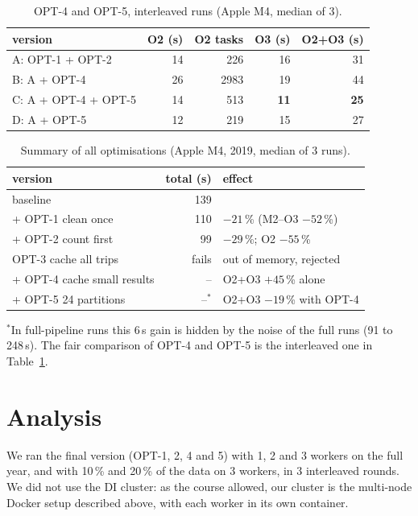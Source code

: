 \documentclass[sigconf]{acmart}
\begin{document}
\begin{table}[h]
\caption{OPT-4 and OPT-5, interleaved runs (Apple M4, median of 3).}
\label{tab:ab}
\begin{tabular}{lrrrr}
\toprule
version & O2 (s) & O2 tasks & O3 (s) & O2+O3 (s) \\
\midrule
A: OPT-1 + OPT-2 & 14 & 226 & 16 & 31 \\
B: A + OPT-4 & 26 & 2983 & 19 & 44 \\
C: A + OPT-4 + OPT-5 & 14 & 513 & \textbf{11} & \textbf{25} \\
D: A + OPT-5 & 12 & 219 & 15 & 27 \\
\bottomrule
\end{tabular}
\end{table}

\begin{table}[h]
\caption{Summary of all optimisations (Apple M4, 2019, median of 3 runs).}
\label{tab:summary}
\begin{tabular}{lrl}
\toprule
version & total (s) & effect \\
\midrule
baseline & 139 & \\
+ OPT-1 clean once & 110 & $-21$\,\% (M2--O3 $-52$\,\%) \\
+ OPT-2 count first & 99 & $-29$\,\%; O2 $-55$\,\% \\
OPT-3 cache all trips & fails & out of memory, rejected \\
+ OPT-4 cache small results & -- & O2+O3 $+45$\,\% alone \\
+ OPT-5 24 partitions & --$^{*}$ & O2+O3 $-19$\,\% with OPT-4 \\
\bottomrule
\end{tabular}

\smallskip
{\footnotesize $^{*}$In full-pipeline runs this 6\,s gain is hidden by the noise of the full runs (91 to 248\,s). The fair
comparison of OPT-4 and OPT-5 is the interleaved one in Table~\ref{tab:ab}.}
\end{table}

\section{Analysis}

We ran the final version (OPT-1, 2, 4 and 5) with 1, 2 and 3 workers on the full year, and with 10\,\% and 20\,\% of
the data on 3 workers, in 3 interleaved rounds. We did not use the DI cluster: as the course allowed, our cluster is
the multi-node Docker setup described above, with each worker in its own container.
\end{document}
